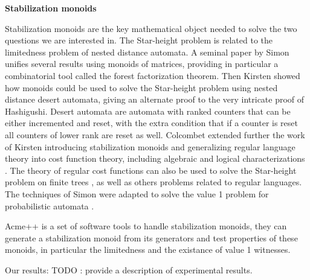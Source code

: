 \textbf{Stabilization monoids}

Stabilization monoids are the key mathematical object needed to solve the two questions we are interested in.
The Star-height problem is related to the limitedness problem of nested distance automata.
A seminal paper by Simon \cite{Sim94} unifies several results using monoids of matrices, providing in particular a combinatorial tool called the forest factorization theorem. 
Then Kirsten showed how monoids could be used to solve the Star-height problem using nested distance desert automata,
giving an alternate proof to the very intricate proof of Hashigushi.
Desert automata are automata with ranked counters that can be either incremented and reset,
with the extra condition that if a counter is reset all counters of lower rank are reset as well.
Colcombet extended further the work of Kirsten introducing stabilization monoids and generalizing regular language theory into cost function theory, including algebraic and logical characterizations \cite{Colcombet09,CKL10,Kup14}. The theory of regular cost functions can also be used to solve the Star-height problem on finite trees \cite{CL08sh}, as well as others problems related to regular languages.
The techniques of Simon were adapted to solve the value 1 problem for probabilistic automata \cite{FGO12}.


Acme++ is a set of software tools to handle stabilization monoids, they can generate a stabilization monoid from its generators and test properties of these monoids, in particular the limitedness and the existance of value 1 witnesses.

Our results:
TODO : provide a description of experimental results.